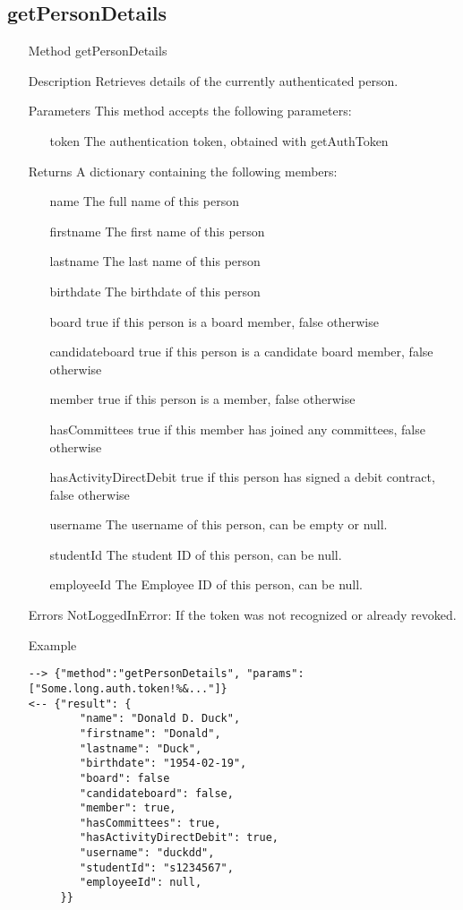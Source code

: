 \documentclass[a4paper]{scrreprt}
\begin{document}
\subsection{getPersonDetails}
\begin{enumerate}
\item[Method] getPersonDetails
\item[Description] Retrieves details of the currently authenticated person.
\item[Parameters] This method accepts the following parameters:
	\begin{enumerate}
		\item[token] The authentication token, obtained with getAuthToken
    \end{enumerate}
\item[Returns] A dictionary containing the following members:
\begin{enumerate}
	\item[name] The full name of this person
    \item[firstname] The first name of this person
    \item[lastname] The last name of this person
    \item[birthdate] The birthdate of this person
    \item[board] true if this person is a board member, false otherwise
    \item[candidateboard] true if this person is a candidate board member, false otherwise
    \item[member] true if this person is a member, false otherwise
    \item[hasCommittees] true if this member has joined any committees, false otherwise
    \item[hasActivityDirectDebit] true if this person has signed a debit contract, false otherwise
    \item[username] The username of this person, can be empty or null.
    \item[studentId] The student ID of this person, can be null.
    \item[employeeId] The Employee ID of this person, can be null.
	\end{enumerate}
\item[Errors] NotLoggedInError: If the token was not recognized or already revoked.
\item[Example]
\begin{lstlisting}
--> {"method":"getPersonDetails", "params":["Some.long.auth.token!%&..."]}
<-- {"result": {
        "name": "Donald D. Duck", 
        "firstname": "Donald", 
        "lastname": "Duck",
        "birthdate": "1954-02-19", 
        "board": false
        "candidateboard": false, 
        "member": true, 
        "hasCommittees": true,
        "hasActivityDirectDebit": true,  
        "username": "duckdd", 
        "studentId": "s1234567", 
        "employeeId": null, 
     }}
\end{lstlisting}
\end{enumerate}
\end{document}
